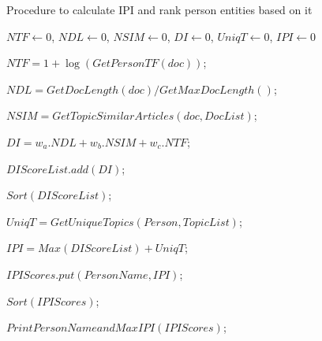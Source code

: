 \begin{algorithm}[!htb]
\caption{Procedure to calculate IPI and rank person entities based on it}
\label{algorithm:3}
\begin{algorithmic}
  

 $NTF \leftarrow $0,  $NDL \leftarrow $0, $NSIM \leftarrow $0, $DI\leftarrow $0, $UniqT\leftarrow $0, $IPI\leftarrow $0\;  
  
     {
	{	
		$NTF=1+\log (GetPersonTF(doc))$;
		
$NDL=GetDocLength(doc)/GetMaxDocLength()$;

		$ NSIM=GetTopicSimilarArticles(doc,DocList)$;

		$DI=w_a . NDL+w_b . NSIM+ w_c . NTF$;
		
		$DIScoreList.add(DI)$;
 	 }
		$Sort(DIScoreList)$;

		$UniqT=GetUniqueTopics(Person,TopicList)$;

		$IPI=Max(DIScoreList)+UniqT$;

		$IPIScores.put(PersonName,IPI)$;
       }
	$Sort(IPIScores)$;

	$PrintPersonNameandMaxIPI(IPIScores)$;

\EndFunction
\end{algorithmic}
\end{algorithm}

